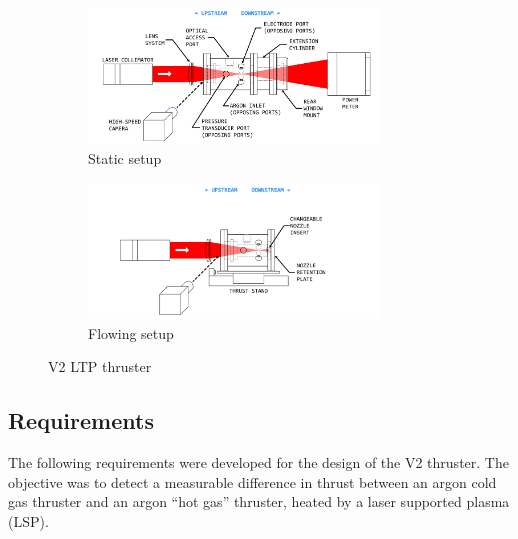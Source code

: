         \begin{figure}[!ht]
            \centering
            \begin{subfigure}[t]{\textwidth}
                \centering
                \includegraphics[width=0.85\textwidth]{assets/3 design/V2 Static config.pdf}
                \caption{Static setup}
            \end{subfigure}
            \hfill
            \begin{subfigure}[t]{\textwidth}
                \centering
                \includegraphics[width=0.85\textwidth]{assets/3 design/V2 Flowing config.pdf}
                \caption{Flowing setup}
            \end{subfigure}
            \caption{V2 LTP thruster}
            \label{fig:V2 setup}
        \end{figure}

        \subsection{Requirements}

            The following requirements were developed for the design of the V2 thruster. The objective was to detect a measurable difference in thrust between an argon cold gas thruster and an argon “hot gas” thruster, heated by a laser supported plasma (LSP).

